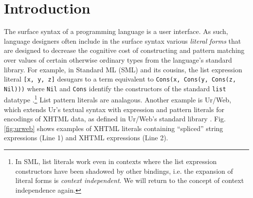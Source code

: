 \documentclass[acmsmall,10pt,review,anonymous]{acmart}\settopmatter{printfolios=true}
\newcommand{\li}[1]{\lstinline{#1}}
\begin{document}
\newcommand{\introSec}{Introduction}
\section{\protect\introSec}
\label{sec:intro}
The surface syntax of a programming language is a user interface. As such, language designers often include in the surface syntax various \emph{literal forms}  that are designed to decrease the cognitive cost of constructing and pattern matching over values of certain otherwise ordinary types from the language's standard library. For example, in Standard ML (SML) and its cousins, the list expression literal \li{[x, y, z]} desugars to a term equivalent to \li{Cons(x, Cons(y, Cons(z, Nil)))} where \li{Nil} and \li{Cons} identify the constructors of the standard \li{list} datatype \cite{mthm97-for-dart,harper1997programming}.\footnote{In SML, list literals work even in contexts where the list expression constructors have been shadowed by other bindings, i.e. the expansion of literal forms is \emph{context independent}. We will return to the concept of context independence again.} List pattern literals are analagous. Another example is Ur/Web, which extends Ur's textual syntax with expression and pattern literals for encodings of XHTML data, as defined in Ur/Web's standard library \cite{conf/popl/Chlipala15,conf/pldi/Chlipala10}. Fig. \ref{fig:urweb} shows examples of XHTML literals containing ``spliced'' string expressions (Line 1) and XHTML expressions (Line 2). 
\end{document}
